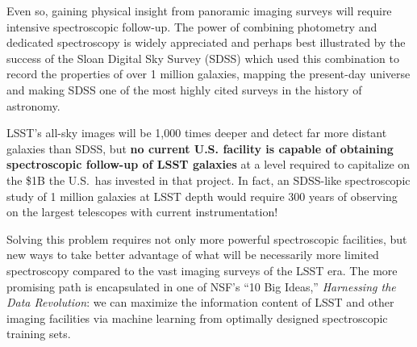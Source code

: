 \documentclass[oneside,11pt]{amsart}
\begin{document}


Even so, gaining physical insight from panoramic imaging surveys will require intensive spectroscopic follow-up.  The
power of combining photometry and dedicated spectroscopy is widely appreciated and perhaps best illustrated by the
success of the Sloan Digital Sky Survey (SDSS) which used this combination to record the properties of over 1 million
galaxies, mapping the present-day universe and making SDSS one of the most highly cited surveys in the history of
astronomy.


LSST's all-sky images will be 1,000 times deeper and detect far more
distant galaxies than SDSS, but \textbf{no current U.S. facility is
capable of obtaining spectroscopic follow-up of LSST galaxies} at a level
required to capitalize on the \$1B the U.S.\ has invested in that
project.  In fact, an SDSS-like spectroscopic study of 1 million
galaxies at LSST depth would require 300 years of observing on the
largest telescopes with current instrumentation!  

Solving this problem requires not only more powerful spectroscopic facilities, but new ways to take better advantage of
what will be necessarily more limited spectroscopy compared to the vast imaging surveys of the LSST era.  The more
promising path is encapsulated in one of NSF's ``10 Big Ideas,'' \emph{Harnessing the Data Revolution}: we can maximize
the information content of LSST and other imaging facilities via machine learning from optimally designed spectroscopic
training sets.
\end{document}
